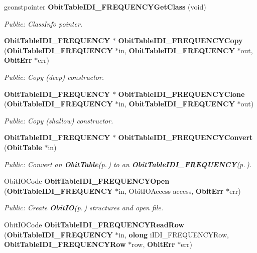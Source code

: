\begin{CompactItemize}
gconstpointer {\bf Obit\-Table\-IDI\_\-FREQUENCYGet\-Class} (void)
\begin{CompactList}\small\item\em Public: Class\-Info pointer. \item\end{CompactList}\item 
{\bf Obit\-Table\-IDI\_\-FREQUENCY} $\ast$ {\bf Obit\-Table\-IDI\_\-FREQUENCYCopy} ({\bf Obit\-Table\-IDI\_\-FREQUENCY} $\ast$in, {\bf Obit\-Table\-IDI\_\-FREQUENCY} $\ast$out, {\bf Obit\-Err} $\ast$err)
\begin{CompactList}\small\item\em Public: Copy (deep) constructor. \item\end{CompactList}\item 
{\bf Obit\-Table\-IDI\_\-FREQUENCY} $\ast$ {\bf Obit\-Table\-IDI\_\-FREQUENCYClone} ({\bf Obit\-Table\-IDI\_\-FREQUENCY} $\ast$in, {\bf Obit\-Table\-IDI\_\-FREQUENCY} $\ast$out)
\begin{CompactList}\small\item\em Public: Copy (shallow) constructor. \item\end{CompactList}\item 
{\bf Obit\-Table\-IDI\_\-FREQUENCY} $\ast$ {\bf Obit\-Table\-IDI\_\-FREQUENCYConvert} ({\bf Obit\-Table} $\ast$in)
\begin{CompactList}\small\item\em Public: Convert an {\bf Obit\-Table}{\rm (p.\,\pageref{structObitTable})} to an {\bf Obit\-Table\-IDI\_\-FREQUENCY}{\rm (p.\,\pageref{structObitTableIDI__FREQUENCY})}. \item\end{CompactList}\item 
Obit\-IOCode {\bf Obit\-Table\-IDI\_\-FREQUENCYOpen} ({\bf Obit\-Table\-IDI\_\-FREQUENCY} $\ast$in, Obit\-IOAccess access, {\bf Obit\-Err} $\ast$err)
\begin{CompactList}\small\item\em Public: Create {\bf Obit\-IO}{\rm (p.\,\pageref{structObitIO})} structures and open file. \item\end{CompactList}\item 
Obit\-IOCode {\bf Obit\-Table\-IDI\_\-FREQUENCYRead\-Row} ({\bf Obit\-Table\-IDI\_\-FREQUENCY} $\ast$in, {\bf olong} i\-IDI\_\-FREQUENCYRow, {\bf Obit\-Table\-IDI\_\-FREQUENCYRow} $\ast$row, {\bf Obit\-Err} $\ast$err)

\end{CompactItemize}
